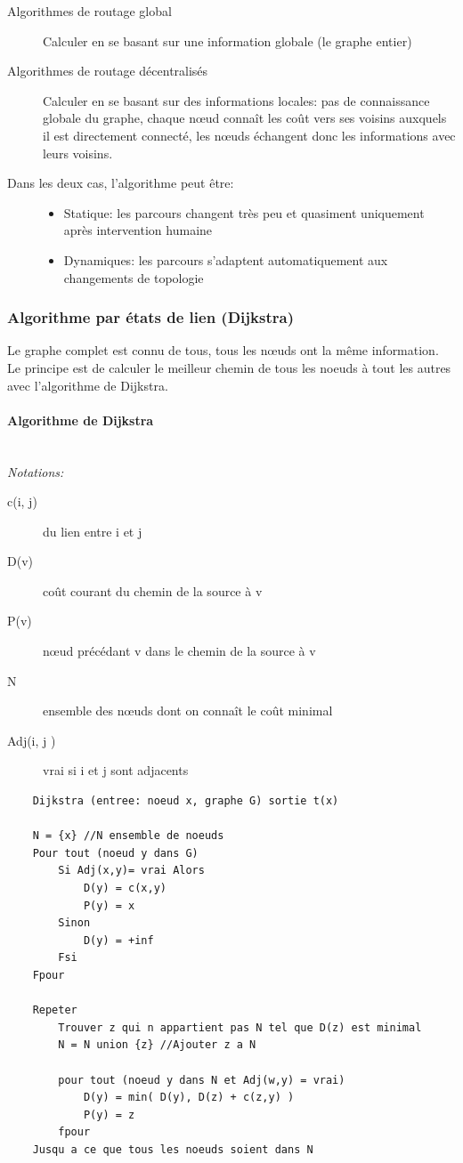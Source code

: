 \documentclass[a4paper, 12pt, french]{article}
\begin{document}
	\begin{description}
		\item[Algorithmes de routage global] Calculer en se basant sur une information globale (le graphe entier)
		\item[Algorithmes de routage décentralisés] Calculer en se basant sur des informations locales: pas de connaissance globale du graphe, chaque nœud connaît les coût vers ses voisins auxquels il est directement connecté, les nœuds échangent donc les informations avec leurs voisins.
		\item[Dans les deux cas, l'algorithme peut être:]
		\begin{itemize}
			\item Statique: les parcours changent très peu et quasiment uniquement après intervention humaine
			\item Dynamiques: les parcours s'adaptent automatiquement aux changements de topologie
		\end{itemize}
	\end{description}

	\subsubsection{Algorithme par états de lien (Dijkstra)}

	Le graphe complet est connu de tous, tous les nœuds ont la même information. Le principe est de calculer le meilleur chemin de tous les noeuds à tout les autres avec l'algorithme de Dijkstra.

	\paragraph{Algorithme de Dijkstra}\mbox{}\\

	\emph{Notations:}
	\begin{description}
		\item[c(i, j)] du lien entre i et j
		\item[D(v)] coût courant du chemin de la source à v
		\item[P(v)] nœud précédant v dans le chemin de la source à v
		\item[N] ensemble des nœuds dont on connaît le coût minimal
		\item[Adj(i, j )] vrai si i et j sont adjacents
	\end{description}

	\begin{lstlisting}
	Dijkstra (entree: noeud x, graphe G) sortie t(x)

	N = {x} //N ensemble de noeuds
	Pour tout (noeud y dans G)
		Si Adj(x,y)= vrai Alors
			D(y) = c(x,y)
			P(y) = x
		Sinon 
			D(y) = +inf
		Fsi
	Fpour

	Repeter
		Trouver z qui n appartient pas N tel que D(z) est minimal
		N = N union {z} //Ajouter z a N

		pour tout (noeud y dans N et Adj(w,y) = vrai)
			D(y) = min( D(y), D(z) + c(z,y) )
			P(y) = z
		fpour
	Jusqu a ce que tous les noeuds soient dans N
	\end{lstlisting}
\end{document}
